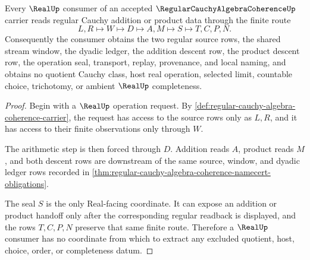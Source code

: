 \begin{theorem}
\label{thm:regular-cauchy-algebra-coherence-operation-seal}
Every $\RealUp$ consumer of an accepted $\RegularCauchyAlgebraCoherenceUp$ carrier reads regular Cauchy addition or product data through the finite route
$$
L,R \longmapsto W \longmapsto D \longmapsto A,M \longmapsto S \longmapsto T,C,P,N .
$$
Consequently the consumer obtains the two regular source rows, the shared stream window, the dyadic ledger, the addition descent row, the product descent row, the operation seal, transport, replay, provenance, and local naming, and obtains no quotient Cauchy class, host real operation, selected limit, countable choice, trichotomy, or ambient $\RealUp$ completeness.
\end{theorem}
\begin{proof}
Begin with a $\RealUp$ operation request. By \autoref{def:regular-cauchy-algebra-coherence-carrier}, the request has access to the source rows only as $L,R$, and it has access to their finite observations only through $W$.

The arithmetic step is then forced through $D$. Addition reads $A$, product reads $M$, and both descent rows are downstream of the same source, window, and dyadic ledger rows recorded in \autoref{thm:regular-cauchy-algebra-coherence-namecert-obligations}.

The seal $S$ is the only Real-facing coordinate. It can expose an addition or product handoff only after the corresponding regular readback is displayed, and the rows $T,C,P,N$ preserve that same finite route. Therefore a $\RealUp$ consumer has no coordinate from which to extract any excluded quotient, host, choice, order, or completeness datum.
\end{proof}

